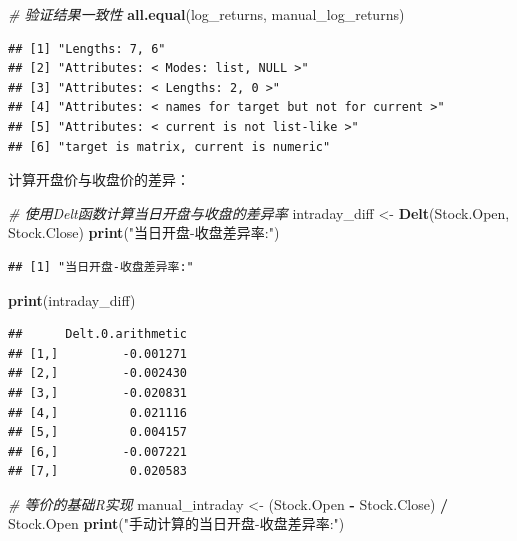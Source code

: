 \documentclass[]{ctexbook}
\newenvironment{Shaded}{\begin{snugshade}}{\end{snugshade}}
\newcommand{\CommentTok}[1]{\textcolor[rgb]{0.56,0.35,0.01}{\textit{#1}}}
\newcommand{\FunctionTok}[1]{\textcolor[rgb]{0.13,0.29,0.53}{\textbf{#1}}}
\newcommand{\NormalTok}[1]{#1}
\newcommand{\OtherTok}[1]{\textcolor[rgb]{0.56,0.35,0.01}{#1}}
\newcommand{\SpecialCharTok}[1]{\textcolor[rgb]{0.81,0.36,0.00}{\textbf{#1}}}
\newcommand{\StringTok}[1]{\textcolor[rgb]{0.31,0.60,0.02}{#1}}
\begin{document}
\begin{Shaded}
\begin{Highlighting}[]
\CommentTok{\# 验证结果一致性}
\FunctionTok{all.equal}\NormalTok{(log\_returns, manual\_log\_returns)}
\end{Highlighting}
\end{Shaded}

\begin{verbatim}
## [1] "Lengths: 7, 6"                                       
## [2] "Attributes: < Modes: list, NULL >"                   
## [3] "Attributes: < Lengths: 2, 0 >"                       
## [4] "Attributes: < names for target but not for current >"
## [5] "Attributes: < current is not list-like >"            
## [6] "target is matrix, current is numeric"
\end{verbatim}

计算开盘价与收盘价的差异：

\begin{Shaded}
\begin{Highlighting}[]
\CommentTok{\# 使用Delt函数计算当日开盘与收盘的差异率}
\NormalTok{intraday\_diff }\OtherTok{\textless{}{-}} \FunctionTok{Delt}\NormalTok{(Stock.Open, Stock.Close)}
\FunctionTok{print}\NormalTok{(}\StringTok{"当日开盘{-}收盘差异率:"}\NormalTok{)}
\end{Highlighting}
\end{Shaded}

\begin{verbatim}
## [1] "当日开盘-收盘差异率:"
\end{verbatim}

\begin{Shaded}
\begin{Highlighting}[]
\FunctionTok{print}\NormalTok{(intraday\_diff)}
\end{Highlighting}
\end{Shaded}

\begin{verbatim}
##      Delt.0.arithmetic
## [1,]         -0.001271
## [2,]         -0.002430
## [3,]         -0.020831
## [4,]          0.021116
## [5,]          0.004157
## [6,]         -0.007221
## [7,]          0.020583
\end{verbatim}

\begin{Shaded}
\begin{Highlighting}[]
\CommentTok{\# 等价的基础R实现}
\NormalTok{manual\_intraday }\OtherTok{\textless{}{-}}\NormalTok{ (Stock.Open }\SpecialCharTok{{-}}\NormalTok{ Stock.Close) }\SpecialCharTok{/}\NormalTok{ Stock.Open}
\FunctionTok{print}\NormalTok{(}\StringTok{"手动计算的当日开盘{-}收盘差异率:"}\NormalTok{)}
\end{Highlighting}
\end{Shaded}
\end{document}
